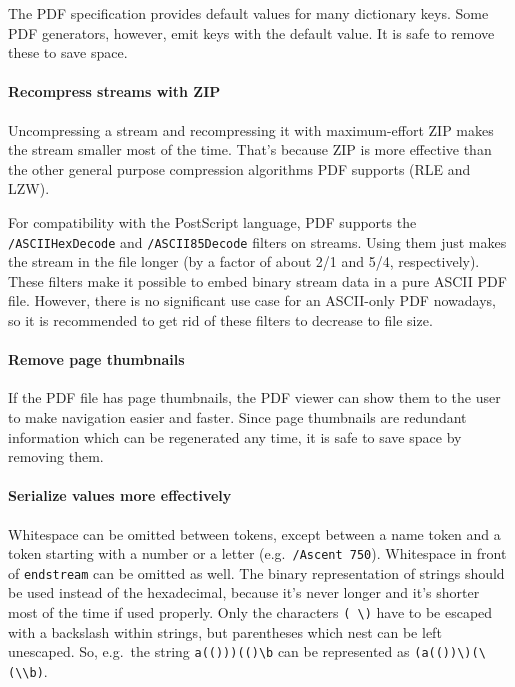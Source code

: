 \documentclass{ltugproc}
\newcommand\DD{\discretionary{\the \textfont 1\char"2E}{}{}}
\begin{document}
The PDF specification provides default values for many dictionary keys. Some
PDF generators, however, emit keys with the default value. It is safe to
remove these to save space.

\paragraph{Recompress streams with ZIP}

Uncompressing a stream and recompressing it with maximum-effort ZIP makes
the stream smaller most of the time. That's because ZIP is more effective
than the other general purpose compression algorithms PDF supports (RLE and
LZW).

For compatibility with the PostScript language, PDF supports the
\texttt{/ASCIIHexDecode} and \texttt{/ASCII\DD 85\DD Decode} filters on
streams.
Using them just makes the stream in the file longer (by a factor of
about 2/1 and 5/4, respectively). These filters make it possible to embed
binary stream data in a pure ASCII PDF file. However, there is no
significant use case for an ASCII-only PDF nowadays, so it is recommended to
get rid of these filters to decrease to file size.

\paragraph{Remove page thumbnails}

If the PDF file has page thumbnails, the PDF viewer can show them to the
user to make navigation easier and faster. Since page thumbnails are redundant
information which can be regenerated any time, it is safe to save space by
removing them.

\paragraph{Serialize values more effectively}

Whitespace can be omitted between tokens, except between a name token and a
token starting with a number or a letter (e.g.\ \texttt{/Ascent 750}).
Whitespace in front of \texttt{endstream} can be omitted as well. The binary
representation of strings should be used instead of the hexadecimal, because
it's never longer and it's shorter most of the time if used properly. Only
the characters \texttt{( \textbackslash\space)} have to be escaped with a
backslash within strings, but parentheses which nest can be left unescaped.
So, e.g.\ the string \texttt{a(()))(()\textbackslash b} can be represented
as
\texttt{(a(())\textbackslash)(\textbackslash(\textbackslash\textbackslash b)}.
\end{document}
